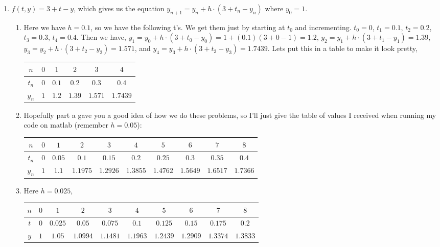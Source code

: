 \documentclass[reqno]{amsart}
\theoremstyle{definition}
\begin{document}
\begin{enumerate}

\item  $f(t,y) = 3 + t - y$, which gives us the equation $y_{n+1} = y_n + h\cdot(3 + t_n - y_n)$
where $y_0 = 1$.

\begin{enumerate}

\item  Here we have $h = 0.1$, so we have the following t's.  We get them just by
starting at $t_0$ and incrementing.  $t_0 = 0$, $t_1 = 0.1$, $t_2 = 0.2$, $t_3 = 0.3$,
$t_4 = 0.4$.  Then we have, $y_1 = y_0 + h\cdot(3+t_0-y_0) = 1 + (0.1)(3+0-1) = 1.2$,
$y_2 = y_1 + h\cdot(3+t_1-y_1) = 1.39$, $y_3 = y_2 + h\cdot(3+t_2-y_2) = 1.571$,
and $y_4 = y_3 + h\cdot(3+t_3-y_3) = 1.7439$.  Lets put this in a table to make it
look pretty,

\begin{tabular}{|c||c|c|c|c|c|}
\hline
$n$ & $0$ & $1$ & $2$ & $3$ & $4$\\
\hline
$t_n$ & $0$ & $0.1$ & $0.2$ & $0.3$ & $0.4$\\
\hline
$y_n$ & $1$ & $1.2$ & $1.39$ & $1.571$ & $1.7439$\\
\hline
\end{tabular}

\item  Hopefully part a gave you a good idea of how we do these problems, so I'll just give
the table of values I received when running my code on matlab (remember $h = 0.05$):

\begin{tabular}{|c||c|c|c|c|c|c|c|c|c|}
\hline
$n$ & $0$ & $1$ & $2$ & $3$ & $4$ & $5$ & $6$ & $7$ & $8$\\
\hline
$t_n$ & $0$ & $0.05$ & $0.1$ & $0.15$ & $0.2$ & $0.25$ & $0.3$ & $0.35$ & $0.4$\\
\hline
$y_n$ & $1$ & $1.1$ & $1.1975$ & $1.2926$ & $1.3855$ & $1.4762$ & $1.5649$
& $1.6517$ & $1.7366$\\
\hline
\end{tabular}

\item  Here $h = 0.025$,

\begin{tabular}{|c||c|c|c|c|c|c|c|c|c|}
\hline
$n$ & $0$ & $1$ & $2$ & $3$ & $4$ & $5$ & $6$ & $7$ & $8$\\
\hline
$t$ & $0$ & $0.025$ & $0.05$ & $0.075$ & $0.1$ & $0.125$ & $0.15$ & $0.175$ & $0.2$\\
\hline
$y$ & $1$ & $1.05$ & $1.0994$ & $1.1481$ & $1.1963$ & $1.2439$ & $1.2909$ & $1.3374$ & $1.3833$\\
\hline
\end{tabular}


\end{enumerate}
\end{enumerate}
\end{document}
